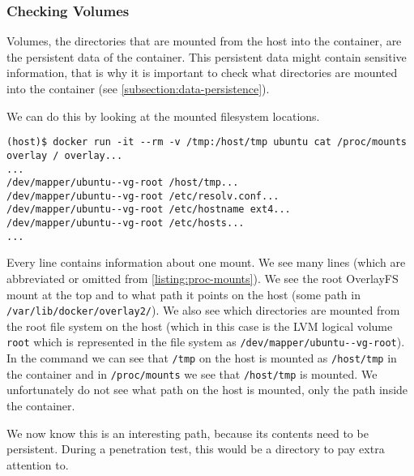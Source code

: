 \subsubsection{Checking Volumes}\label{subsubsection:volumes}
Volumes, the directories that are mounted from the host into the container, are the persistent data of the container. This persistent data might contain sensitive information, that is why it is important to check what directories are mounted into the container (see \autoref{subsection:data-persistence}).

We can do this by looking at the mounted filesystem locations.
\begin{lstlisting}[caption={The (abbreviated) contents of \lstinline{/proc/mounts} in a Docker container.},captionpos=b,label={listing:proc-mounts}]
(host)$ docker run -it --rm -v /tmp:/host/tmp ubuntu cat /proc/mounts
overlay / overlay...
...
/dev/mapper/ubuntu--vg-root /host/tmp...
/dev/mapper/ubuntu--vg-root /etc/resolv.conf...
/dev/mapper/ubuntu--vg-root /etc/hostname ext4...
/dev/mapper/ubuntu--vg-root /etc/hosts...
...
\end{lstlisting}

Every line contains information about one mount. We see many lines (which are abbreviated or omitted from \autoref{listing:proc-mounts}). We see the root OverlayFS mount at the top and to what path it points on the host (some path in \lstinline{/var/lib/docker/overlay2/}). We also see which directories are mounted from the root file system on the host (which in this case is the LVM logical volume \lstinline{root} which is represented in the file system as \lstinline{/dev/mapper/ubuntu--vg-root}). In the command we can see that \lstinline{/tmp} on the host is mounted as \lstinline{/host/tmp} in the container and in \lstinline{/proc/mounts} we see that \lstinline{/host/tmp} is mounted. We unfortunately do not see what path on the host is mounted, only the path inside the container.

We now know this is an interesting path, because its contents need to be persistent. During a penetration test, this would be a directory to pay extra attention to.
